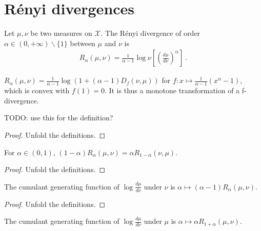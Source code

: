 \chapter{Rényi divergences}

\begin{definition}
  \label{def:Renyi}
  Let $\mu, \nu$ be two measures on $\mathcal X$. The Rényi divergence of order $\alpha \in (0,+\infty) \backslash \{1\}$ between $\mu$ and $\nu$ is
  \begin{align*}
  R_\alpha(\mu, \nu) = \frac{1}{\alpha - 1}\log \nu\left[\left(\frac{d \mu}{d \nu}\right)^\alpha\right] \: .
  \end{align*}
\end{definition}

\begin{lemma}
  \label{lem:renyi_eq_log_fDiv}
  $R_\alpha(\mu, \nu) = \frac{1}{\alpha - 1} \log (1 + (\alpha - 1) D_f(\nu, \mu))$ for $f : x \mapsto \frac{1}{\alpha - 1}(x^{\alpha} - 1)$, which is convex with $f(1)=0$. It is thus a monotone transformation of a f-divergence.

  TODO: use this for the definition?
\end{lemma}

\begin{proof}
Unfold the definitions.
\end{proof}

\begin{lemma}
  \label{lem:renyi_symm}
  For $\alpha \in (0, 1)$, $(1 - \alpha) R_\alpha(\mu, \nu) = \alpha R_{1 - \alpha}(\nu, \mu)$.
\end{lemma}

\begin{proof}
Unfold the definitions.
\end{proof}

\begin{lemma}
  \label{lem:renyi_cgf}
  The cumulant generating function of $\log\frac{d\mu}{d\nu}$ under $\nu$ is $\alpha \mapsto (\alpha - 1) R_\alpha(\mu, \nu)$.
\end{lemma}

\begin{proof}
Unfold the definitions.
\end{proof}

\begin{lemma}
  \label{lem:renyi_cgf_2}
  The cumulant generating function of $\log\frac{d\mu}{d\nu}$ under $\mu$ is $\alpha \mapsto \alpha R_{1+\alpha}(\mu, \nu)$.
\end{lemma}


